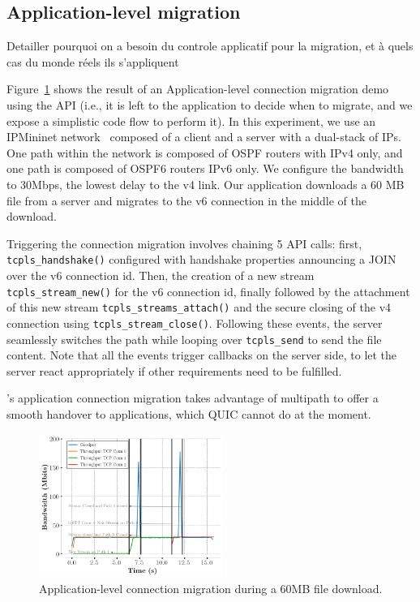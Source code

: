 \subsection{Application-level migration}

Detailler pourquoi on a besoin du controle applicatif pour la migration, et à
quels cas du monde réels ils s'appliquent


Figure~\ref{fig:conn_migration} shows the result of an Application-level
connection migration demo using the API (i.e., it is left to the
application to decide when to migrate, and we expose a simplistic code flow to
perform it). In this experiment, we use an IPMininet network~\cite{ipmininet, jadin2020educational}
composed of a client and a server with a dual-stack of IPs. One path within the
network is composed of OSPF routers with IPv4 only, and one path is composed of
OSPF6 routers IPv6 only. We configure the bandwidth to 30Mbps, the lowest delay
to the v4 link. Our application
downloads a 60 MB file from a server and migrates to the v6 connection in
the middle of the download.

Triggering the connection migration involves chaining 5 API calls:
first, \texttt{tcpls\_handshake()} configured with handshake properties announcing a JOIN over the v6 connection id. Then, the creation of a new stream
\texttt{tcpls\_stream\_new()} for the v6 connection id, finally followed by the attachment of this new stream \texttt{tcpls\_streams\_attach()} and the secure closing of the v4 \tcp connection using \texttt{tcpls\_stream\_close()}. Following these events, the server seamlessly switches the path while looping over \texttt{tcpls\_send} to send the file content. Note that all the events trigger callbacks on the server side, to let the server react appropriately if other requirements need to be fulfilled.

\tcpls's application connection migration takes advantage of multipath to offer
a smooth handover to applications, which QUIC cannot do at the moment.

\begin{figure}[!t]
  \centering
  \includegraphics[width=6cm]{figures/migration.png}
  \caption{Application-level connection migration during a 60MB file download.}
  \label{fig:conn_migration}
\end{figure}

